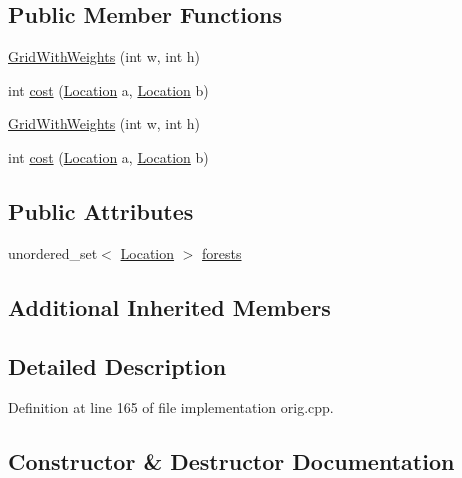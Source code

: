 \subsection*{Public Member Functions}
\begin{DoxyCompactItemize}
\item 
\hyperlink{struct_grid_with_weights_ad9eb67bf93deb3409ecf658288bc78f6}{Grid\+With\+Weights} (int w, int h)
\item 
int \hyperlink{struct_grid_with_weights_a999c39922a9b507e4436b817592a7ff9}{cost} (\hyperlink{struct_square_grid_a2c9a2cbd3912aa48ac97289abc3f1c0f}{Location} a, \hyperlink{struct_square_grid_a2c9a2cbd3912aa48ac97289abc3f1c0f}{Location} b)
\item 
\hyperlink{struct_grid_with_weights_ad9eb67bf93deb3409ecf658288bc78f6}{Grid\+With\+Weights} (int w, int h)
\item 
int \hyperlink{struct_grid_with_weights_a999c39922a9b507e4436b817592a7ff9}{cost} (\hyperlink{struct_square_grid_a2c9a2cbd3912aa48ac97289abc3f1c0f}{Location} a, \hyperlink{struct_square_grid_a2c9a2cbd3912aa48ac97289abc3f1c0f}{Location} b)
\end{DoxyCompactItemize}
\subsection*{Public Attributes}
\begin{DoxyCompactItemize}
\item 
unordered\+\_\+set$<$ \hyperlink{struct_square_grid_a2c9a2cbd3912aa48ac97289abc3f1c0f}{Location} $>$ \hyperlink{struct_grid_with_weights_a03137c824b8c63cdeed414ef40f5b504}{forests}
\end{DoxyCompactItemize}
\subsection*{Additional Inherited Members}


\subsection{Detailed Description}


Definition at line 165 of file implementation orig.\+cpp.



\subsection{Constructor \& Destructor Documentation}
\mbox{\label{struct_grid_with_weights_ad9eb67bf93deb3409ecf658288bc78f6}} 
